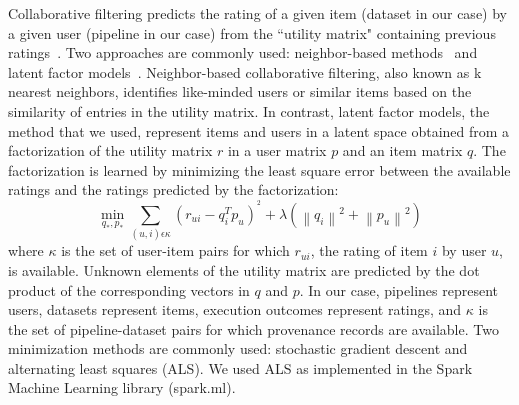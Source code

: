 \documentclass[conference]{IEEEtran}
\begin{document}
Collaborative filtering predicts the rating of a given item (dataset in our
case) by a given user (pipeline in our case) from the ``utility
matrix" containing previous ratings~\cite{rajaraman2011mining}.
Two  approaches are commonly used: neighbor-based
methods~\cite{koren2015advances} and latent factor
models~\cite{koren2009matrix,bokde2015matrix}. Neighbor-based collaborative
filtering, also known as k nearest neighbors, identifies
like-minded users or similar items based on the similarity of entries in
the utility matrix. In contrast, latent factor models, the method that we used, represent items and
users in a latent space obtained from a factorization of the
utility matrix $r$ in a user matrix $p$ and an item matrix $q$. The
factorization is learned by minimizing the least square error between the
available ratings and the ratings predicted by the factorization:
\begin{equation} \tag{1}
   \min_{q_{*},p_{*}} \sum_{(u,i) \epsilon \kappa }  (r_{ui}-q_{i}^{T}p_{u})^{^2}+\lambda \left ( \left \| q_{i}\right \|^2+\left \| p_{u}\right \|^2 \right )            \label{eq}
\end{equation}
where $\kappa$ is the set of user-item pairs for which $r_{ui}$, the rating of item
$i$ by user $u$, is available. Unknown elements of the utility matrix are
predicted by the dot product of the corresponding vectors in $q$ and $p$.
In our case, pipelines represent users, datasets represent items, execution
outcomes represent ratings, and $\kappa$ is the set of pipeline-dataset
pairs for which provenance records are available. Two minimization methods are
commonly used: stochastic gradient descent and alternating least squares
(ALS). We used ALS as implemented in the
Spark Machine Learning library (spark.ml). 


\end{document}
